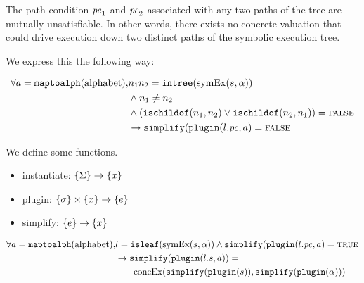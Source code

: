\begin{property}
  \label{prop:kingunique}
The path condition $\mathit{pc}_1$ and $\mathit{pc}_2$ associated with any two paths of the
tree are mutually unsatisfiable. In other words, there exists no concrete
valuation that could drive execution down two distinct paths of the symbolic
execution tree.

We express this the following way: 

\begin{align*}
\forall a = \mathtt{maptoalph}(\mathrm{alphabet}), &  n_1 n_2 =
\mathtt{intree}(\mathrm{symEx}(s,\alpha)) \\
& \wedge
n_1 \neq n_2 \\
&  \wedge
(\mathtt{ischildof}(n_1, n_2) \vee  \mathtt{ischildof}(n_2, n_1))= \mathtt{\textsc{false}} \\
&\rightarrow \mathtt{simplify}(\mathtt{plugin}(l.\mathit{pc},a) = \mathtt{\textsc{false}}
\end{align*}
\end{property}

\begin{property}[Commutativity]
  We define some functions.
  \begin{itemize}
  \item instantiate: $\{\Sigma\} \rightarrow \{x\}$
  \item plugin: $\{\sigma\} \times \{x\} \rightarrow
    \{e\}$
  \item simplify: $\{e\} \rightarrow \{x\}$
  \end{itemize}


\begin{align*}
\forall a = \mathtt{maptoalph}(\mathrm{alphabet}), & l =
\mathtt{isleaf}(\mathrm{symEx}(s,\alpha)) \wedge
\mathtt{simplify}(\mathtt{plugin}(l.\mathit{pc},a) = \mathtt{\textsc{true}} \\
&\rightarrow \mathtt{simplify}(\mathtt{plugin}(l.s,a)) = \\
&\qquad\mathrm{concEx}(\mathtt{simplify}(\mathtt{plugin}(s)),\mathtt{simplify}(\mathtt{plugin}(\alpha)))
\end{align*}
\end{property}

